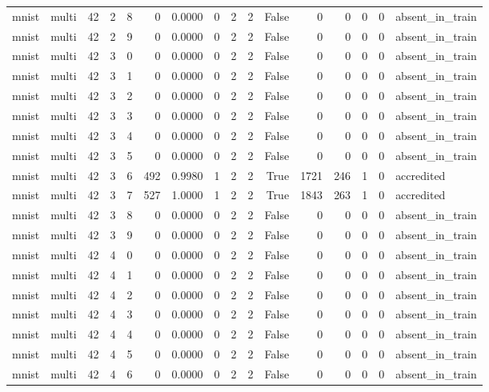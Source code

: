 \begin{tabular}{llrrrrrrrrrrrrrl}
mnist & multi & 42 & 2 & 8 & 0 & 0.0000 & 0 & 2 & 2 & False & 0 & 0 & 0 & 0 & absent\_in\_train \\
mnist & multi & 42 & 2 & 9 & 0 & 0.0000 & 0 & 2 & 2 & False & 0 & 0 & 0 & 0 & absent\_in\_train \\
mnist & multi & 42 & 3 & 0 & 0 & 0.0000 & 0 & 2 & 2 & False & 0 & 0 & 0 & 0 & absent\_in\_train \\
mnist & multi & 42 & 3 & 1 & 0 & 0.0000 & 0 & 2 & 2 & False & 0 & 0 & 0 & 0 & absent\_in\_train \\
mnist & multi & 42 & 3 & 2 & 0 & 0.0000 & 0 & 2 & 2 & False & 0 & 0 & 0 & 0 & absent\_in\_train \\
mnist & multi & 42 & 3 & 3 & 0 & 0.0000 & 0 & 2 & 2 & False & 0 & 0 & 0 & 0 & absent\_in\_train \\
mnist & multi & 42 & 3 & 4 & 0 & 0.0000 & 0 & 2 & 2 & False & 0 & 0 & 0 & 0 & absent\_in\_train \\
mnist & multi & 42 & 3 & 5 & 0 & 0.0000 & 0 & 2 & 2 & False & 0 & 0 & 0 & 0 & absent\_in\_train \\
mnist & multi & 42 & 3 & 6 & 492 & 0.9980 & 1 & 2 & 2 & True & 1721 & 246 & 1 & 0 & accredited \\
mnist & multi & 42 & 3 & 7 & 527 & 1.0000 & 1 & 2 & 2 & True & 1843 & 263 & 1 & 0 & accredited \\
mnist & multi & 42 & 3 & 8 & 0 & 0.0000 & 0 & 2 & 2 & False & 0 & 0 & 0 & 0 & absent\_in\_train \\
mnist & multi & 42 & 3 & 9 & 0 & 0.0000 & 0 & 2 & 2 & False & 0 & 0 & 0 & 0 & absent\_in\_train \\
mnist & multi & 42 & 4 & 0 & 0 & 0.0000 & 0 & 2 & 2 & False & 0 & 0 & 0 & 0 & absent\_in\_train \\
mnist & multi & 42 & 4 & 1 & 0 & 0.0000 & 0 & 2 & 2 & False & 0 & 0 & 0 & 0 & absent\_in\_train \\
mnist & multi & 42 & 4 & 2 & 0 & 0.0000 & 0 & 2 & 2 & False & 0 & 0 & 0 & 0 & absent\_in\_train \\
mnist & multi & 42 & 4 & 3 & 0 & 0.0000 & 0 & 2 & 2 & False & 0 & 0 & 0 & 0 & absent\_in\_train \\
mnist & multi & 42 & 4 & 4 & 0 & 0.0000 & 0 & 2 & 2 & False & 0 & 0 & 0 & 0 & absent\_in\_train \\
mnist & multi & 42 & 4 & 5 & 0 & 0.0000 & 0 & 2 & 2 & False & 0 & 0 & 0 & 0 & absent\_in\_train \\
mnist & multi & 42 & 4 & 6 & 0 & 0.0000 & 0 & 2 & 2 & False & 0 & 0 & 0 & 0 & absent\_in\_train \\

\end{tabular}
